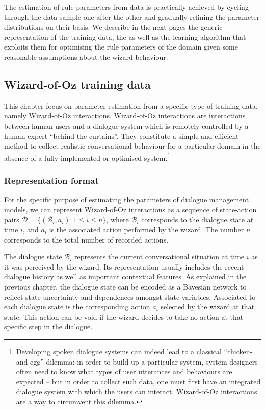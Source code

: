 The estimation of rule parameters from data is practically achieved by cycling through the data sample one after the other and gradually refining the parameter distributions on their basis. We describe in the next pages the generic representation of the training data, the as well as the learning algorithm that exploits them for optimising the rule parameters of the domain given some reasonable assumptions about the wizard behaviour.  

\subsection{Wizard-of-Oz training data}
\label{sec:rule-supervised-oz}

This chapter focus on parameter estimation from a specific type of training data, namely Wizard-of-Oz interactions. Wizard-of-Oz interactions are interactions between human users and a dialogue system which is remotely controlled by a human expert ``behind the curtains''.  They constitute a simple and efficient method to collect realistic conversational behaviour for a particular domain in the absence of a fully implemented or optimised system.\footnote{Developing spoken dialogue systems can indeed lead to a classical ``chicken-and-egg'' dilemma: in order to build up a particular system, system designers often need to know what types of user utterances and behaviours are expected -- but in order to collect such data, one must first have an integrated dialogue system with which the users can interact.  Wizard-of-Oz interactions are a way to circumvent this dilemma.}


\subsubsection*{Representation format}

For the specific purpose of estimating the parameters of dialogue management models, we can represent Wizard-of-Oz interactions as a sequence of state-action pairs $\mathcal{D} = \{( \mathcal{B}_i, a_i ) : 1 \leq i \leq n\}$, where $\mathcal{B}_i$ corresponds to the dialogue state at time $i$, and $a_i$ is the associated action performed by the wizard.  The number $n$ corresponds to the total number of recorded actions. 

The dialogue state $\mathcal{B}_i$ represents the current conversational situation at time $i$ as it was perceived by the wizard.  Its representation usually includes the recent dialogue history as well as important contextual features.  As explained in the previous chapter, the dialogue state can be encoded as a Bayesian network to reflect state uncertainty and dependences amongst state variables. Associated to each dialogue state is the corresponding action $a_i$ selected by the wizard at that state. This action can be void if the wizard decides to take no action at that specific step in the dialogue. 


